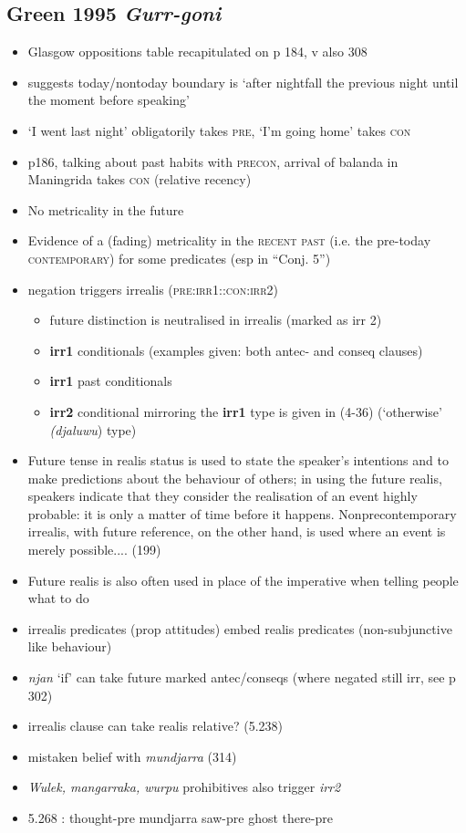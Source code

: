 \documentclass[10pt]{article}
\begin{document}
		\subsection{Green 1995 \textit{Gurr-goni}}
		\begin{itemize}
\item Glasgow oppositions table recapitulated on p 184, v also 308
\item suggests today/nontoday boundary is `after nightfall the previous night until the moment before speaking'
\item `I went last night' obligatorily takes \textsc{pre}, `I'm going home' takes \textsc{con}
\item p186, talking about past habits with \textsc{precon}, arrival of balanda in Maningrida takes \textsc{con} (relative recency)
\item No metricality in the future
\item Evidence of a (fading) metricality in the \textsc{recent past} (i.e. the pre-today \textsc{contemporary}) for some predicates (esp in ``Conj. 5'')
\item negation triggers irrealis (\textsc{pre:irr1::con:irr2})
\begin{itemize}
\item future distinction is neutralised in irrealis (marked as irr 2)
\item \textbf{irr1} conditionals (examples given: both antec- and conseq clauses)
\item \textbf{irr1} past conditionals
\item \textbf{irr2} conditional mirroring the \textbf{irr1} type is given in (4-36) (`otherwise' \textit{(djaluwu}) type)
\end{itemize}
\item Future tense in realis status is used to state the speaker's intentions and to make predictions about the behaviour of others; in using the future realis, speakers indicate that they consider the realisation of an event highly probable: it is only a matter of time before it happens. Nonprecontemporary irrealis, with future reference, on the other hand, is used where an event is merely possible.... (199)
\item Future realis is also often used in place of the imperative when telling people what to do
\item irrealis predicates (prop attitudes) embed realis predicates (non-subjunctive like behaviour)

\item \textit{njan} `if' can take future marked antec/conseqs (where negated still irr, see p 302)
\item irrealis clause can take realis relative? (5.238)
\item mistaken belief with \textit{mundjarra} (314)
\item \textit{Wulek, mangarraka, wurpu } prohibitives also trigger \textit{irr2}
\item 5.268 : thought-pre mundjarra saw-pre ghost there-pre

		\end{itemize}
\end{document}
